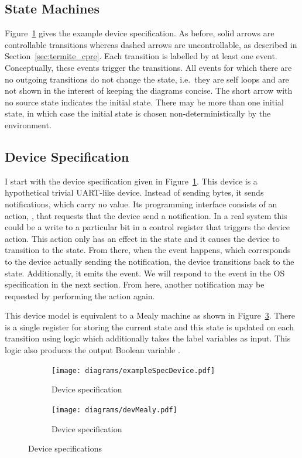 \subsection{State Machines}

Figure~\ref{fig:dev_spec} gives the example device specification. As before, solid arrows are controllable transitions whereas dashed arrows are uncontrollable, as described in Section~\ref{sec:termite_cpre}. Each transition is labelled by at least one event. Conceptually, these events trigger the transitions. All events for which there are no outgoing transitions do not change the state, i.e.\ they are self loops and are not shown in the interest of keeping the diagrams concise. The short arrow with no source state indicates the initial state. There may be more than one initial state, in which case the initial state is chosen non-deterministically by the environment.

\subsection{Device Specification}

I start with the device specification given in Figure~\ref{fig:dev_spec}. This device is a hypothetical trivial UART-like device. Instead of sending bytes, it sends notifications, which carry no value. Its programming interface consists of an action, , that requests that the device send a notification. In a real system this could be a write to a particular bit in a control register that triggers the device action. This action only has an effect in the  state and it causes the device to transition to the  state. From there, when the  event happens, which corresponds to the device actually sending the notification, the device transitions back to the  state. Additionally, it emits the  event. We will respond to the  event in the OS specification in the next section. From here, another notification may be requested by performing the  action again.

This device model is equivalent to a Mealy machine as shown in Figure~\ref{fig:dev_spec_mealy}. There is a single register for storing the current state and this state is updated on each transition using logic which additionally takes the label variables as input. This logic also produces the output Boolean variable .

\begin{figure}
\centering
\begin{subfigure}[t]{0.47\textwidth}
\texttt{[image: diagrams/exampleSpecDevice.pdf]}
\caption{Device specification}
\label{fig:dev_spec}
\end{subfigure}
\hfill
\begin{subfigure}[t]{0.47\textwidth}
\texttt{[image: diagrams/devMealy.pdf]}
\caption{Device specification}
\label{fig:dev_spec_mealy}
\end{subfigure}
\caption{Device specifications}
\end{figure}

